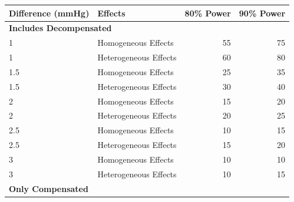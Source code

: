 \documentclass[
]{article}
\newenvironment{Shaded}{\begin{snugshade}}{\end{snugshade}}
\newcommand{\AttributeTok}[1]{\textcolor[rgb]{0.77,0.63,0.00}{#1}}
\newcommand{\DecValTok}[1]{\textcolor[rgb]{0.00,0.00,0.81}{#1}}
\newcommand{\FunctionTok}[1]{\textcolor[rgb]{0.00,0.00,0.00}{#1}}
\newcommand{\NormalTok}[1]{#1}
\newcommand{\SpecialCharTok}[1]{\textcolor[rgb]{0.00,0.00,0.00}{#1}}
\newcommand{\StringTok}[1]{\textcolor[rgb]{0.31,0.60,0.02}{#1}}
\begin{document}
\begin{Shaded}
\end{Shaded}

\begin{table}[H]
\centering
\begin{tabular}{l|l|r|r}
\hline
Difference (mmHg) & Effects & 80\% Power & 90\% Power\\
\hline
\multicolumn{4}{l}{\textbf{Includes Decompensated}}\\
\hline
\hspace{1em}1 & Homogeneous Effects & 55 & 75\\
\hline
\hspace{1em}1 & Heterogeneous Effects & 60 & 80\\
\hline
\hspace{1em}1.5 & Homogeneous Effects & 25 & 35\\
\hline
\hspace{1em}1.5 & Heterogeneous Effects & 30 & 40\\
\hline
\hspace{1em}2 & Homogeneous Effects & 15 & 20\\
\hline
\hspace{1em}2 & Heterogeneous Effects & 20 & 25\\
\hline
\hspace{1em}2.5 & Homogeneous Effects & 10 & 15\\
\hline
\hspace{1em}2.5 & Heterogeneous Effects & 15 & 20\\
\hline
\hspace{1em}3 & Homogeneous Effects & 10 & 10\\
\hline
\hspace{1em}3 & Heterogeneous Effects & 10 & 15\\
\hline
\multicolumn{4}{l}{\textbf{Only Compensated}}\\

\end{tabular}
\end{table}
\end{document}
